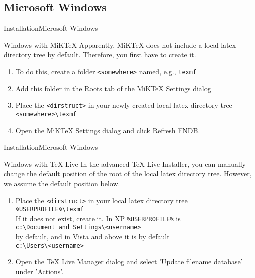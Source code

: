 \documentclass[10pt]{beamer}
\begin{document}
\subsection{Microsoft Windows}
\begin{frame}{Installation}{Microsoft Windows}
  \begin{block}{Windows with MiKTeX}
    Apparently, MiKTeX does not include a local latex directory tree by default. Therefore, you first have to create it.
    \begin{enumerate}
      \item To do this, create a folder {\tt <somewhere>} named, e.g., {\tt texmf}
      \item Add this folder in the Roots tab of the MiKTeX Settings dialog
      \item Place the {\tt <dirstruct>} in your newly created local latex directory tree\\
    {\tt <somewhere>\textbackslash texmf}\\
      \item Open the MiKTeX Settings dialog and click Refresh FNDB.
    \end{enumerate}
  \end{block}
\end{frame}

\begin{frame}{Installation}{Microsoft Windows}
  \begin{block}{Windows with TeX Live}
    In the advanced TeX Live Installer, you can manually change the default position of the root of the local latex directory tree. However, we assume the default position below.
    \begin{enumerate}
      \item Place the {\tt <dirstruct>} in your local latex directory tree\\
        {\tt \%USERPROFILE\%\textbackslash texmf}\\
        If it does not exist, create it. In XP {\tt \%USERPROFILE\%} is\\
      {\tt c:\textbackslash Document and Settings\textbackslash<username>}\\
      by default, and in Vista and above it is by default\\
      {\tt c:\textbackslash Users\textbackslash<username>}
      \item Open the TeX Live Manager dialog and select 'Update filename database' under 'Actions'.
    \end{enumerate}
  \end{block}
\end{frame}
\end{document}
